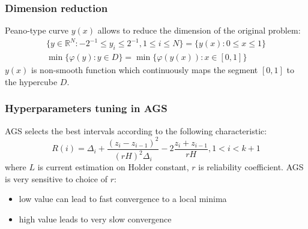 \documentclass[aspectratio=1610]{beamer}
\begin{document}
\begin{frame}
  \begin{center}
  \frametitle{Dimension reduction}
  Peano-type curve \(y(x)\) allows to reduce the dimension of the original problem:
  \begin{gather}
    \lbrace y\in \mathbb{R}^N:-2^{-1}\leqslant y_i\leqslant 2^{-1},1\leqslant i\leqslant N\rbrace=\{y(x):0\leqslant x\leqslant 1\} \nonumber \\
    \min\{\varphi(y): y\in D\}=\min\{\varphi(y(x)): x\in [0,1]\} \nonumber
  \end{gather}
  \(y(x)\) is non-smooth function which continuously maps the segment \([0,1]\) to the hypercube \(D\).
  \begin{figure}[ht]
    \vspace*{-0.5cm}
  \end{figure}
\end{center}
\end{frame}

\begin{frame}
  \frametitle{Hyperparameters tuning in AGS}
  AGS selects the best intervals according to the following characteristic:
  \begin{displaymath}
    R(i)=\Delta_i+\dfrac{(z_i-z_{i-1})^2}{(rH)^2\Delta_i}-2\dfrac{z_i+z_{i-1}}{rH},1<i<k+1
  \end{displaymath}
  where $L$ is current estimation on Holder constant, $r$ is reliability coefficient.
  AGS is very sensitive to choice of $r$:
  \begin{itemize}
    \item low value can lead to fast convergence to a local minima
    \item high value leads to very slow convergence
  \end{itemize}
\end{frame}
\end{document}
